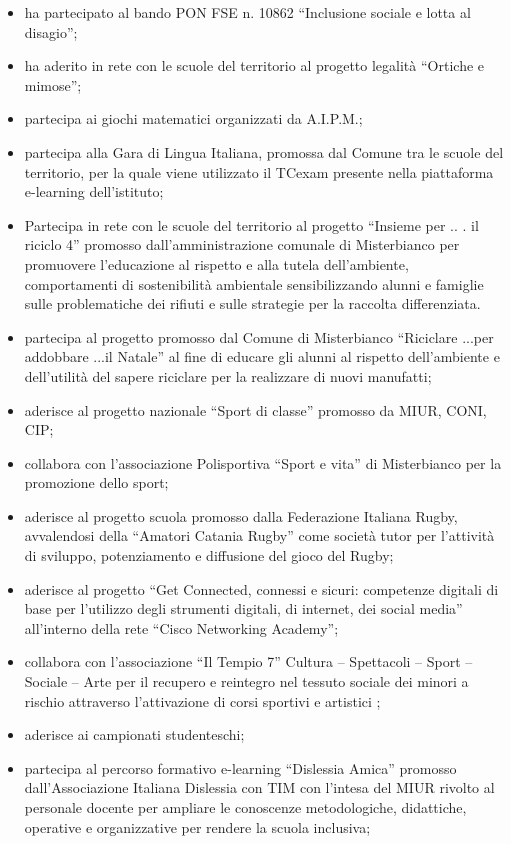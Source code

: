 \documentclass[12pt,a4paper,oneside]{memoir}
\begin{document}
\begin{itemize}
\item ha partecipato al bando PON FSE n. 10862 ``Inclusione sociale e lotta al disagio''; 
\item ha aderito in rete con le scuole del territorio al progetto legalità ``Ortiche e mimose''; 
\item partecipa ai giochi matematici organizzati da A.I.P.M.; 
\item partecipa alla Gara di Lingua Italiana, promossa dal Comune tra le scuole del territorio, per la quale viene utilizzato il TCexam presente nella piattaforma e-learning dell'istituto; 
\item Partecipa in rete con le scuole del territorio al progetto ``Insieme per .. . il riciclo 4'' promosso dall'amministrazione comunale di Misterbianco per promuovere l’educazione al rispetto e alla tutela dell'ambiente, comportamenti di sostenibilità ambientale sensibilizzando alunni e famiglie sulle problematiche dei rifiuti e sulle strategie per la raccolta differenziata. 
\item partecipa al progetto promosso dal Comune di Misterbianco ``Riciclare ...per addobbare ...il Natale'' al fine di educare gli alunni al rispetto dell'ambiente e dell'utilità del sapere riciclare per la realizzare di nuovi manufatti; 
\item aderisce al progetto nazionale ``Sport di classe'' promosso da MIUR, CONI, CIP; 
\item collabora con l'associazione Polisportiva ``Sport e vita'' di Misterbianco per la promozione dello sport; 
   \item aderisce al progetto scuola promosso dalla Federazione Italiana Rugby, avvalendosi della ``Amatori Catania Rugby'' come società tutor per l'attività di sviluppo, potenziamento e diffusione del gioco del Rugby;
   \item aderisce al progetto ``Get Connected, connessi e sicuri: competenze digitali di base per l'utilizzo degli strumenti digitali, di internet, dei social media'' all'interno della rete ``Cisco Networking Academy''; 
   \item collabora con l'associazione ``Il Tempio 7'' Cultura – Spettacoli – Sport – Sociale – Arte per il recupero e reintegro nel tessuto sociale dei minori a rischio attraverso l'attivazione di corsi sportivi e artistici ; 
   \item aderisce ai campionati studenteschi; 
   \item partecipa al percorso formativo e-learning ``Dislessia Amica'' promosso dall'Associazione Italiana Dislessia con TIM con l'intesa del MIUR rivolto al personale docente per ampliare le conoscenze metodologiche, didattiche, operative e organizzative per rendere la scuola inclusiva; 

\end{itemize}
\end{document}
